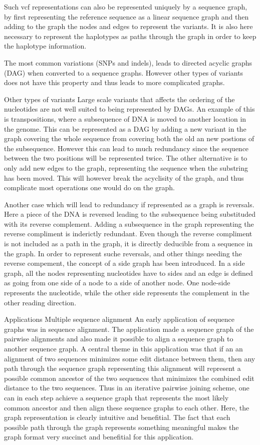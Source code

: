 Such vcf representations can also be represented uniquely by a sequence graph, by first representing the reference sequence as  a linear sequence graph and then adding to the graph the nodes and edges to represent the variants.
It is also here necessary to represent the haplotypes as paths through the graph in order to keep the haplotype information.

The most common variations (SNPs and indels), leads to directed acyclic graphs (DAG) when converted to a sequence graphs.
However other types of variants does not have this property and thus leads to more complicated graphs. 

Other types of variants
Large scale variants that affects the ordering of the nucleotides are not well suited to being represented by DAGs.
An example of this is transpositions, where a subsequence of DNA is moved to another location in the genome.
This can be represented as a DAG by adding a new variant in the graph covering the whole sequence from covering both the old an new postions of  the subsequence.
However this can lead to much redundancy since the sequence between the two positions will be represented twice.
The other alternative is to only add new edges to the graph, representing the sequence when the substring has been moved.
This will however break the acyclisity of the graph, and thus complicate most operations one would do on the graph. 

Another case which will lead to redundancy if represented as a graph is reversals.
Here a piece of the DNA is reversed leading to the subsequence being substituded with its reverse complement.
Adding a subsequence in the graph representing the reverse compliment is inderictly redundant.
Even though the reverse compliment is not included as a path in the graph, it is directly deducible from a sequence in the graph.
In order to represent suche reversals, and other things needing the reverse compement, the concept of a side graph has been introduced.
In a side graph, all the nodes representing nucleotides have to sides and an edge is defined as going from one side of a node to a side of another node.
One node-side represents the nucleotide, while the other side represents the complement in the other reading direction. 

Applications
Multiple sequence alignment
An early application of sequence graphs was in sequence alignment.
The application made a sequence graph of the pairwise alignments and also made it possible to align a sequence graph to another sequence graph.
A central theme in this application was that if an an alignment of two sequences minimizes some edit distance between them, then any path through the sequence graph representing this alignment will represent a possible common ancestor of the two sequences that minimizes the combined edit distance to the two sequences.
Thus in an iterative pairwise joining scheme, one can in each step achieve a sequence graph that represents the most likely common ancestor and then align these sequence graphs to each other.
Here, the graph representation is clearly intuitive and benefitial.
The fact that each possible path through the graph represents something meaningful makes the graph format very succinct and benefitial for this application. 

